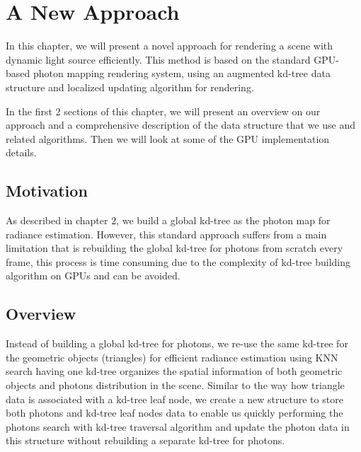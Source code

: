 \setcounter{figure}{0}

\chapter{A New Approach}


In this chapter, we will present a novel approach for rendering a scene with dynamic light source efficiently. This method is based on the standard GPU-based photon mapping rendering system, using an augmented kd-tree data structure and localized updating algorithm for rendering.

In the first 2 sections of this chapter, we will present an overview on our approach and a comprehensive description of the data structure that we use and related algorithms. Then we will look at some of the GPU implementation details.

\section{Motivation}
As described in chapter 2, we build a global kd-tree as the photon map for radiance estimation. However, this standard approach suffers from a main limitation that is rebuilding the global kd-tree for photons from scratch every frame, this process is time consuming due to the complexity of kd-tree building algorithm on GPUs and can be avoided.

\section{Overview}
Instead of building a global kd-tree for photons, we re-use the same kd-tree for the geometric objects (triangles) for efficient
radiance estimation using KNN search having one kd-tree organizes the spatial information of both geometric objects and photons distribution in the scene. Similar to the way how triangle data is associated with a kd-tree leaf node, we create a new structure to store both photons and kd-tree leaf nodes data to enable us quickly performing the photons search with kd-tree traversal algorithm   and update the photon data in this structure without rebuilding a separate kd-tree for photons.


